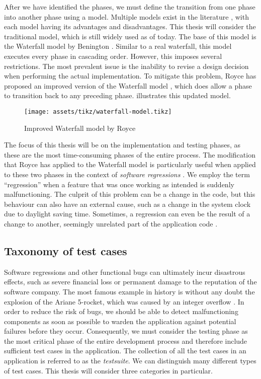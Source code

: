 \noindent After we have identified the phases, we must define the transition from one phase into another phase using a model. Multiple models exist in the literature \cite{2010govardhan}, with each model having its advantages and disadvantages. This thesis will consider the traditional model, which is still widely used as of today. The base of this model is the Waterfall model by Benington  \cite{united1956symposium}. Similar to a real waterfall, this model executes every phase in cascading order. However, this imposes several restrictions. The most prevalent issue is the inability to revise a design decision when performing the actual implementation. To mitigate this problem, Royce has proposed an improved version of the Waterfall model \cite{Royce:1987:MDL:41765.41801}, which does allow a phase to transition back to any preceding phase.  illustrates this updated model.

\begin{figure}[htbp!]
	\texttt{[image: assets/tikz/waterfall-model.tikz]}
	\caption{Improved Waterfall model by Royce}
	\label{fig:waterfall-royce}
\end{figure}

\noindent The focus of this thesis will be on the implementation and testing phases, as these are the most time-consuming phases of the entire process. The modification that Royce has applied to the Waterfall model is particularly useful when applied to these two phases in the context of \emph{software regressions} \cite{10.1007/978-3-540-77966-7_18}. We employ the term ``regression'' when a feature that was once working as intended is suddenly malfunctioning. The culprit of this problem can be a change in the code, but this behaviour can also have an external cause, such as a change in the system clock due to daylight saving time. Sometimes, a regression can even be the result of a change to another, seemingly unrelated part of the application code \cite{6588537}.

\subsection{Taxonomy of test cases}

Software regressions and other functional bugs can ultimately incur disastrous effects, such as severe financial loss or permanent damage to the reputation of the software company. The most famous example in history is without any doubt the explosion of the Ariane 5-rocket, which was caused by an integer overflow \cite{581900}. In order to reduce the risk of bugs, we should be able to detect malfunctioning components as soon as possible to warden the application against potential failures before they occur. Consequently, we must consider the testing phase as the most critical phase of the entire development process and therefore include sufficient test cases in the application. The collection of all the test cases in an application is referred to as the \emph{\gls{testsuite}}. We can distinguish many different types of test cases. This thesis will consider three categories in particular.

